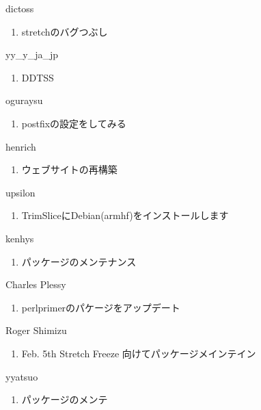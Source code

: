 \begin{prework}{ dictoss }
  \begin{enumerate}
  \item stretchのバグつぶし
  \end{enumerate}
\end{prework}

\begin{prework}{ yy\_y\_ja\_jp }
  \begin{enumerate}
  \item DDTSS
  \end{enumerate}
\end{prework}

\begin{prework}{ oguraysu }
  \begin{enumerate}
  \item postfixの設定をしてみる
  \end{enumerate}
\end{prework}

\begin{prework}{ henrich }
  \begin{enumerate}
  \item ウェブサイトの再構築
  \end{enumerate}
\end{prework}

\begin{prework}{ upsilon }
  \begin{enumerate}
  \item TrimSliceにDebian(armhf)をインストールします
  \end{enumerate}
\end{prework}

\begin{prework}{ kenhys }
  \begin{enumerate}
  \item パッケージのメンテナンス
  \end{enumerate}
\end{prework}

\begin{prework}{ Charles Plessy }
  \begin{enumerate}
  \item perlprimerのパケージをアップデート
  \end{enumerate}
\end{prework}

\begin{prework}{ Roger Shimizu }
  \begin{enumerate}
  \item Feb. 5th Stretch Freeze 向けてパッケージメインテイン
  \end{enumerate}
\end{prework}

\begin{prework}{ yyatsuo }
  \begin{enumerate}
  \item パッケージのメンテ
  \end{enumerate}
\end{prework}
